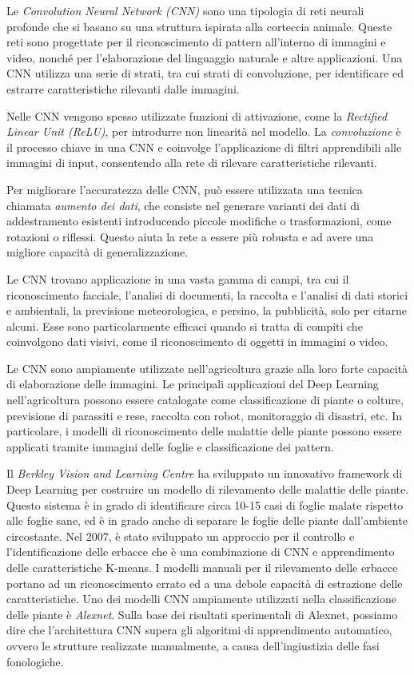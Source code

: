 Le \textit{Convolution Neural Network (CNN)} sono una tipologia di reti neurali profonde che si basano su una struttura ispirata alla corteccia animale. Queste reti sono progettate per il riconoscimento di pattern all'interno di immagini e video, nonché per l'elaborazione del linguaggio naturale e altre applicazioni. Una CNN utilizza una serie di strati, tra cui strati di convoluzione, per identificare ed estrarre caratteristiche rilevanti dalle immagini.

Nelle CNN vengono spesso utilizzate funzioni di attivazione, come la \textit{Rectified Linear Unit (ReLU)}, per introdurre non linearità nel modello. La \textit{convoluzione} è il processo chiave in una CNN e coinvolge l'applicazione di filtri apprendibili alle immagini di input, consentendo alla rete di rilevare caratteristiche rilevanti.

Per migliorare l'accuratezza delle CNN, può essere utilizzata una tecnica chiamata \textit{aumento dei dati}, che consiste nel generare varianti dei dati di addestramento esistenti introducendo piccole modifiche o trasformazioni, come rotazioni o riflessi. Questo aiuta la rete a essere più robusta e ad avere una migliore capacità di generalizzazione.

Le CNN trovano applicazione in una vasta gamma di campi, tra cui il riconoscimento facciale, l'analisi di documenti, la raccolta e l'analisi di dati storici e ambientali, la previsione meteorologica, e persino, la pubblicità, solo per citarne alcuni. Esse sono particolarmente efficaci quando si tratta di compiti che coinvolgono dati visivi, come il riconoscimento di oggetti in immagini o video.

Le CNN sono ampiamente utilizzate nell'agricoltura grazie alla loro forte capacità di elaborazione delle immagini. Le principali applicazioni del Deep Learning nell'agricoltura possono essere catalogate come classificazione di piante o colture, previsione di parassiti e rese, raccolta con robot, monitoraggio di disastri, etc. In particolare, i modelli di riconoscimento delle malattie delle piante possono essere applicati tramite immagini delle foglie e classificazione dei pattern.

Il \textit{Berkley Vision and Learning Centre} ha sviluppato un innovativo framework di Deep Learning per costruire un modello di rilevamento delle malattie delle piante. Questo sistema è in grado di identificare circa 10-15 casi di foglie malate rispetto alle foglie sane, ed è in grado anche di separare le foglie delle piante dall'ambiente circostante. Nel 2007, è stato sviluppato un approccio per il controllo e l'identificazione delle erbacce che è una combinazione di CNN e apprendimento delle caratteristiche K-means. I modelli manuali per il rilevamento delle erbacce portano ad un riconoscimento errato ed a una debole capacità di estrazione delle caratteristiche. Uno dei modelli CNN ampiamente utilizzati nella classificazione delle piante è \textit{Alexnet}. Sulla base dei risultati sperimentali di Alexnet, possiamo dire che l'architettura CNN supera gli algoritmi di apprendimento automatico, ovvero le strutture realizzate manualmente, a causa dell'ingiustizia delle fasi fonologiche.

